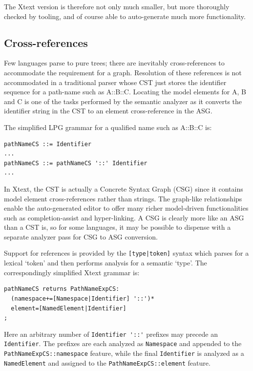 \documentclass[runningheads,a4paper]{llncs}
\begin{document}
The Xtext version is therefore not only much smaller, but more thoroughly checked by tooling, and of course able to auto-generate much more functionality.

\subsection{Cross-references}

Few languages parse to pure trees; there are inevitably cross-references to accommodate the requirement for a graph. Resolution of these references is not accommodated in a traditional parser whose CST just stores the identifier sequence for a path-name such as A::B::C. Locating the model elements for A, B and C is one of the tasks performed by the semantic analyzer as it converts the identifier string in the CST to an element cross-reference in the ASG.

The simplified LPG grammar for a qualified name such as A::B::C is:

{\small\begin{verbatim}
pathNameCS ::= Identifier
...
pathNameCS ::= pathNameCS '::' Identifier
...
\end{verbatim}}        

In Xtext, the CST is actually a Concrete Syntax Graph (CSG) since it contains model element cross-references rather than strings. The graph-like relationships enable the auto-generated editor to offer many richer model-driven functionalities such as completion-assist and hyper-linking. A CSG is clearly more like an ASG than a CST is, so for some languages, it may be possible to dispense with a separate analyzer pass for CSG to ASG conversion.

Support for references is provided by the \verb+[type|token]+ syntax which parses for a lexical `token' and then performs analysis for a semantic `type'. The correspondingly simplified Xtext grammar is:

{\small\begin{verbatim}
pathNameCS returns PathNameExpCS:
  (namespace+=[Namespace|Identifier] '::')*
  element=[NamedElement|Identifier]
;
\end{verbatim}}

Here an arbitrary number of \verb+Identifier '::'+ prefixes may precede an \verb+Identifier+. The prefixes are each analyzed as \verb+Namespace+ and appended to the \verb+PathNameExpCS::namespace+ feature, while the final \verb+Identifier+ is analyzed as a \verb+NamedElement+ and assigned to the \verb+PathNameExpCS::element+ feature.
\end{document}
